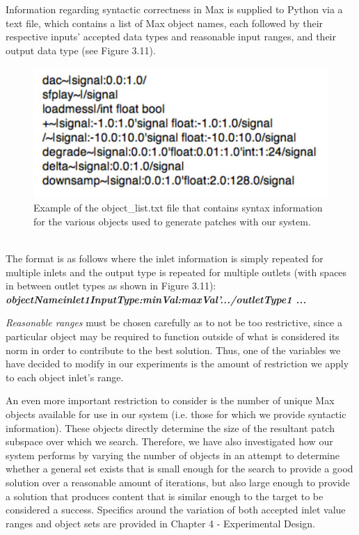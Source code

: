 \documentclass[a4paper,12pt]{report} 	%
\numberwithin{figure}{chapter}
\numberwithin{table}{chapter}
\numberwithin{equation}{chapter}
\begin{document}
\begin{flushleft}
Information regarding syntactic correctness in Max is supplied to Python via a text file, which contains a list of Max object names, each followed by their respective inputs' accepted data types and reasonable input ranges, and their output data type (see Figure 3.11).
\begin{figure}[h!]
\begin{center}
\includegraphics[scale=0.8]{SyntaxInfo}
\caption[Object List File]{Example of the object\_list.txt file that contains syntax information for the various objects used to generate patches with our system.}
\end{center}
\end{figure}
\\
The format is as follows where the inlet information is simply repeated for multiple inlets and the output type is repeated for multiple outlets (with spaces in between outlet types as shown in Figure 3.11):
\\
\textbf{\emph{objectName\textbar inlet1InputType:minVal:maxVal'.../outletType1 ...}}

\emph{Reasonable ranges} must be chosen carefully as to not be too restrictive, since a particular object may be required to function outside of what is considered its norm in order to contribute to the best solution. Thus, one of the variables we have decided to modify in our experiments is the amount of restriction we apply to each object inlet's range.

An even more important restriction to consider is the number of unique Max objects available for use in our system (i.e. those for which we provide syntactic information). These objects directly determine the size of the resultant patch subspace over which we search. Therefore, we have also investigated how our system performs by varying the number of objects in an attempt to determine whether a general set exists that is small enough for the search to provide a good solution over a reasonable amount of iterations, but also large enough to provide a solution that produces content that is similar enough to the target to be considered a success. Specifics around the variation of both accepted inlet value ranges and object sets are provided in Chapter 4 - Experimental Design.


\end{flushleft}
\end{document}
